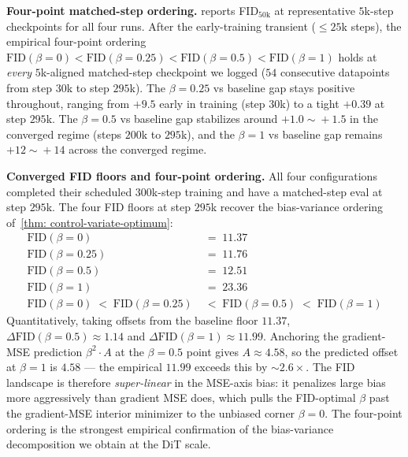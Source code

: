 \begin{appendices}
    \noindent\textbf{Four-point matched-step ordering.}  reports FID$_{50\text{k}}$ at representative $5$k-step checkpoints for all four runs. After the early-training transient ($\le\!25$k steps), the empirical four-point ordering $\mathrm{FID}(\beta\!=\!0)\!<\!\mathrm{FID}(\beta\!=\!0.25)\!<\!\mathrm{FID}(\beta\!=\!0.5)\!<\!\mathrm{FID}(\beta\!=\!1)$ holds at \emph{every} $5$k-aligned matched-step checkpoint we logged ($54$ consecutive datapoints from step $30$k to step $295$k). The $\beta\!=\!0.25$ vs baseline gap stays positive throughout, ranging from $+9.5$ early in training (step $30$k) to a tight $+0.39$ at step $295$k. The $\beta\!=\!0.5$ vs baseline gap stabilizes around $+1.0\!\sim\!+1.5$ in the converged regime (steps $200$k to $295$k), and the $\beta\!=\!1$ vs baseline gap remains $+12\!\sim\!+14$ across the converged regime.

    \noindent\textbf{Converged FID floors and four-point ordering.} All four configurations completed their scheduled $300$k-step training and have a matched-step eval at step $295$k. The four FID floors at step $295$k recover the bias-variance ordering of~\cref{thm: control-variate-optimum}:
    \begin{align*}
        \mathrm{FID}(\beta\!=\!0)&\;=\;11.37\\
        \mathrm{FID}(\beta\!=\!0.25)&\;=\;11.76\\
        \mathrm{FID}(\beta\!=\!0.5)&\;=\;12.51\\
        \mathrm{FID}(\beta\!=\!1)&\;=\;23.36\\
        \mathrm{FID}(\beta\!=\!0)\;<\;\mathrm{FID}(\beta\!=\!0.25)&\;<\;\mathrm{FID}(\beta\!=\!0.5)\;<\;\mathrm{FID}(\beta\!=\!1)
    \end{align*}
    Quantitatively, taking offsets from the baseline floor $11.37$, $\Delta\mathrm{FID}(\beta\!=\!0.5)\!\approx\!1.14$ and $\Delta\mathrm{FID}(\beta\!=\!1)\!\approx\!11.99$. Anchoring the gradient-MSE prediction $\beta^{2}\!\cdot\!A$ at the $\beta\!=\!0.5$ point gives $A\!\approx\!4.58$, so the predicted offset at $\beta\!=\!1$ is $4.58$ — the empirical $11.99$ exceeds this by $\sim\!2.6\!\times$. The FID landscape is therefore \emph{super-linear} in the MSE-axis bias: it penalizes large bias more aggressively than gradient MSE does, which pulls the FID-optimal $\beta$ past the gradient-MSE interior minimizer to the unbiased corner $\beta\!=\!0$. The four-point ordering is the strongest empirical confirmation of the bias-variance decomposition we obtain at the DiT scale.


\end{appendices}
